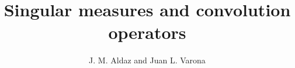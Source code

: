 \documentclass[12pt,a4paper]{amsart}
\theoremstyle{plain}
\theoremstyle{remark}
\begin{document}


\title{Singular measures and convolution operators}

%
\author{J. M. Aldaz and Juan L. Varona}

\address{Departamento de Matem\'aticas y Computaci\'on,
Universidad de La Rioja,
Calle Luis de Ulloa s/n,
26004 Logro\~no, Spain}



\end{document}
